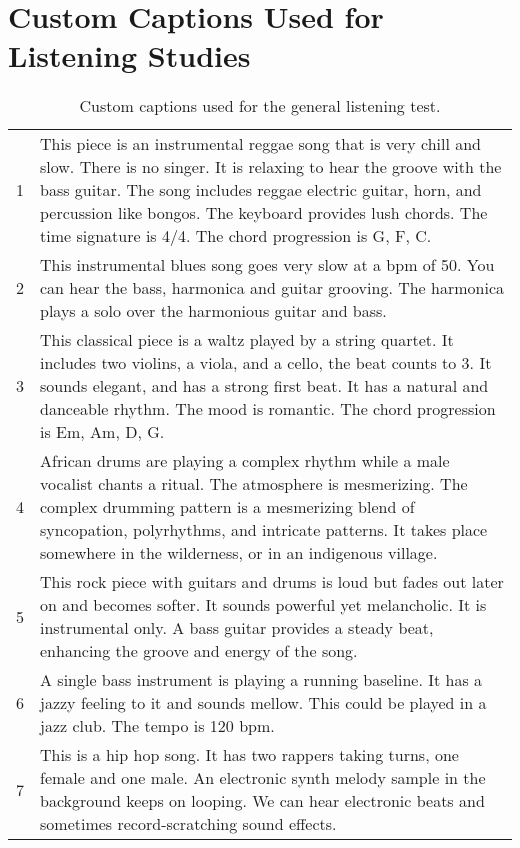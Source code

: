 \documentclass[11pt]{article}
\begin{document}
\clearpage
\FloatBarrier
\section{Custom Captions Used for Listening Studies}
\label{sec:captions}
\FloatBarrier


\begin{table*}[h]
\caption{Custom captions used for the general listening test. }
\footnotesize
\begin{tabular}{p{0.4cm} p{15cm}} 
\toprule
1& This piece is an instrumental reggae song that is very chill and slow. There is no singer. It is relaxing to hear the groove with the bass guitar. The song includes reggae electric guitar, horn, and percussion like bongos. The keyboard provides lush chords. The time signature is 4/4. The chord progression is G, F, C.\\ 
2& This instrumental blues song goes very slow at a bpm of 50. You can hear the bass, harmonica and guitar grooving. The harmonica plays a solo over the harmonious guitar and bass.  \\
3 & This classical piece is a waltz played by a string quartet. It includes two violins, a viola, and a cello, the beat counts to 3. It sounds elegant, and has a strong first beat. It has a natural and danceable rhythm. The mood is romantic. The chord progression is Em, Am, D, G. \\
4& African drums are playing a complex rhythm while a male vocalist chants a ritual. The atmosphere is mesmerizing. The complex drumming pattern is a mesmerizing blend of syncopation, polyrhythms, and intricate patterns. It takes place somewhere in the wilderness, or in an indigenous village. \\
5& This rock piece with guitars and drums is loud but fades out later on and becomes softer. It sounds powerful yet melancholic. It is instrumental only. A bass guitar provides a steady beat, enhancing the groove and energy of the song.    \\
6& A single bass instrument is playing a running baseline. It has a jazzy feeling to it and sounds mellow. This could be played in a jazz club. The tempo is 120 bpm.    \\
7& This is a hip hop song. It has two rappers taking turns, one female and one male. An electronic synth melody sample in the background keeps on looping. We can hear electronic beats and sometimes record-scratching sound effects.     \\

\end{tabular}
\end{table*}
\end{document}
